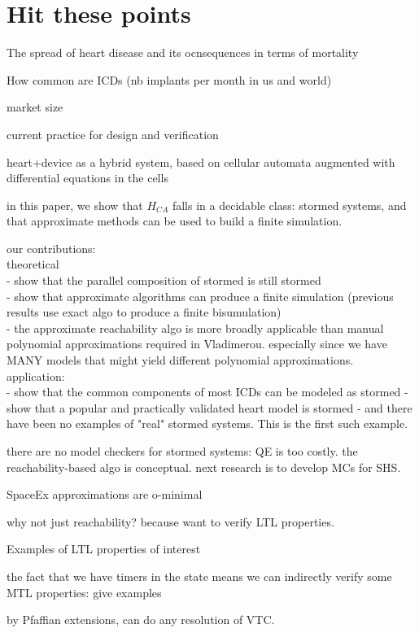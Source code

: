 \section{Hit these points}

The spread of heart disease and its ocnsequences in terms of mortality

How common are ICDs (nb implants per month in us and world)

market size

current practice for design and verification

heart+device as a hybrid system, based on cellular automata augmented with differential equations in the cells

in this paper, we show that $H_{CA}$ falls in a decidable class: stormed systems, and that approximate methods can be used to build a finite simulation.

our contributions:\\
theoretical\\
- show that the parallel composition of stormed is still stormed
\\
- show that approximate algorithms can produce a finite simulation (previous results use exact algo to produce a finite bisumulation)
\\
- the approximate reachability algo is more broadly applicable than manual polynomial approximations required in Vladimerou. especially since we have MANY models that might yield different polynomial approximations.
\\
application:\\
- show that the common components of most ICDs can be modeled as stormed
- show that a popular and practically validated heart model is stormed
- and there have been no examples of "real" stormed systems. This is the first such example.

there are no model checkers for stormed systems:
QE is too costly. 
the reachability-based algo is conceptual.
next research is to develop MCs for SHS.

SpaceEx approximations are o-minimal

why not just reachability? because want to verify LTL properties.

Examples of LTL properties of interest

the fact that we have timers in the state means we can indirectly verify some MTL properties: give examples

by Pfaffian extensions, can do any resolution of VTC.

